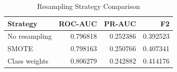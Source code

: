 \begin{table}
\caption{Resampling Strategy Comparison}
\label{tab:smote}
\begin{tabular}{lrrr}
\toprule
Strategy & ROC-AUC & PR-AUC & F2 \\
\midrule
No resampling & 0.796818 & 0.252386 & 0.392523 \\
SMOTE & 0.798163 & 0.250766 & 0.407341 \\
Class weights & 0.806279 & 0.242882 & 0.414176 \\
\bottomrule
\end{tabular}
\end{table}
